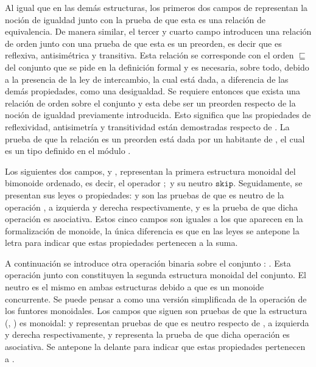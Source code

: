 Al igual que en las demás estructuras, los primeros dos campos de  representan la noción de igualdad junto con la prueba de que esta es una relación de equivalencia. De manera similar, el tercer y cuarto campo introducen una relación de orden junto con una prueba de que esta es un preorden, es decir que es reflexiva, antisimétrica y transitiva. Esta relación se corresponde con el orden $\sqsubseteq$ del conjunto que se pide en la definición formal y es necesaria, sobre todo, debido a la presencia de la ley de intercambio, la cual está dada, a diferencia de las demás propiedades, como una desigualdad. Se requiere entonces que exista una relación de orden sobre el conjunto  y esta debe ser un preorden respecto de la noción de igualdad previamente introducida. Esto significa que las propiedades de reflexividad, antisimetría y transitividad están demostradas respecto de . La prueba  de que la relación  es un preorden está dada por un habitante de , el cual es un tipo  definido en el módulo \href{https://agda.github.io/agda-stdlib/Relation.Binary.Structures.html}{}.

Los siguientes dos campos,  y , representan la primera estructura monoidal del bimonoide ordenado, es decir, el operador $;$ y su neutro $\mathtt{skip}$. Seguidamente, se presentan sus leyes o propiedades:  y  son las pruebas de que  es neutro de la operación , a izquierda y derecha respectivamente, y  es la prueba de que dicha operación es asociativa. Estos cinco campos son iguales a los que aparecen en la formalización de monoide, la única diferencia es que en las leyes se antepone la letra  para indicar que estas propiedades pertenecen a la suma. 

A continuación se introduce otra operación binaria sobre el conjunto : . Esta operación junto con  constituyen la segunda estructura monoidal del conjunto. El neutro es el mismo en ambas estructuras debido a que es un monoide concurrente. Se puede pensar a  como una versión simplificada de la operación  de los funtores monoidales. Los campos que siguen son pruebas de que la estructura (, ) es monoidal:  y  representan pruebas de que  es neutro respecto de , a izquierda y derecha respectivamente, y  representa la prueba de que dicha operación es asociativa. Se antepone la  delante para indicar que estas propiedades pertenecen a . 

